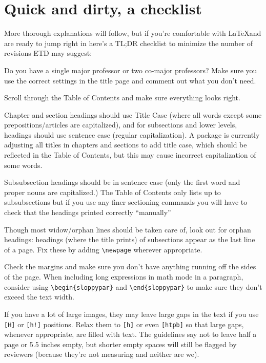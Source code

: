 \chapter{Quick and dirty, a checklist}
More thorough explanations will follow, but if you're comfortable with \LaTeX and are ready to jump right in here's a TL;DR checklist to minimize the number of revisions ETD may suggest:

\begin{todolist}
\item Do you have a single major professor or two co-major professors? Make sure you use the correct settings in the title page and comment out what you don't need.
\item Scroll through the Table of Contents and make sure everything looks right. 
\begin{todolist}
\item Chapter and section headings should use Title Case (where all words except some prepositions/articles are capitalized), and for subsections and lower levels, headings should use sentence case (regular capitalization). A package is currently adjusting all titles in chapters and sections to add title case, which should be reflected in the Table of Contents, but this may cause incorrect capitalization of some words.
\item Subsubsection headings should be in sentence case (only the first word and proper nouns are capitalized.) The Table of Contents only lists up to subsubsections but if you use any finer sectioning commands you will have to check that the headings printed correctly ``manually''
\end{todolist}
\item Though most widow/orphan lines should be taken care of, look out for orphan headings: headings (where the title prints) of subsections appear as the last line of a page. Fix these by adding \verb|\newpage| wherever appropriate.
\item Check the margins and make sure you don't have anything running off the sides of the page. When including long expressions in math mode in a paragraph, consider using \verb|\begin{sloppypar}| and \verb|\end{sloppypar}| to make sure they don't exceed the text width. 
\item If you have a lot of large images, they may leave large gaps in the text if you use \texttt{[H]} or \texttt{[h!]} positions. Relax them to \texttt{[h]} or even \texttt{[htpb]} so that large gaps, whenever appropriate, are filled with text. The guidelines say not to leave half a page or 5.5 inches empty, but shorter empty spaces will still be flagged by reviewers (because they're not measuring and neither are we). 

\end{todolist}
